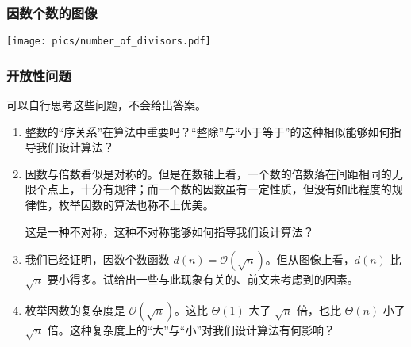 \begin{frame}[c]
  \frametitle{因数个数的图像}
  \begin{center}
    \texttt{[image: pics/number\_of\_divisors.pdf]}
  \end{center}
\end{frame}
\begin{frame}
  \frametitle{开放性问题}
  可以自行思考这些问题，不会给出答案。
  \begin{enumerate}
    \item 整数的“\alert{序关系}”在算法中重要吗？“整除”与“小于等于”的这种相似能够如何指导我们设计算法？
    \item 因数与倍数看似是对称的。但是在数轴上看，一个数的倍数落在间距相同的无限个点上，十分有规律；而一个数的因数虽有一定性质，但没有如此程度的规律性，枚举因数的算法也称不上优美。
    
    这是一种\alert{不对称}，这种不对称能够如何指导我们设计算法？
    \item 我们已经证明，因数个数函数 $d(n) = \mathcal O (\sqrt{n})$。但从图像上看，$d(n)$ 比 $\sqrt{n}$ 要小得多。试给出一些与此现象有关的、前文未考虑到的因素。
    \item 枚举因数的复杂度是 $\mathcal O (\sqrt{n})$。这比 $\Theta(1)$ 大了 $\sqrt{n}$ 倍，也比 $\Theta(n)$ 小了 $\sqrt{n}$ 倍。这种复杂度上的“大”与“小”对我们设计算法有何影响？
  \end{enumerate}
\end{frame}
